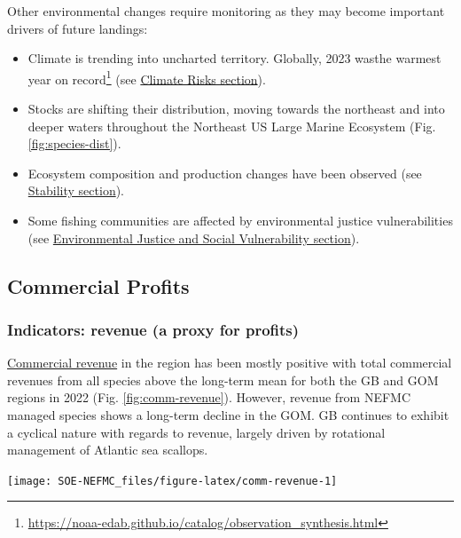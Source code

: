 \documentclass[
  10pt,
]{article}
\providecommand{\tightlist}{%
  \setlength{\itemsep}{0pt}\setlength{\parskip}{0pt}}
\let\origfigure\figure
\let\endorigfigure\endfigure
\renewenvironment{figure}[1][2] {
    \expandafter\origfigure\expandafter[H]
} {
    \endorigfigure
}
\begin{document}
Other environmental changes require monitoring as they may become important drivers of future landings:

\begin{itemize}
\tightlist
\item
  Climate is trending into uncharted territory. Globally, 2023 wasthe warmest year on record\footnote{\url{https://noaa-edab.github.io/catalog/observation_synthesis.html}} (see \protect\hyperlink{climate-risks}{Climate Risks section}).
\item
  Stocks are shifting their distribution, moving towards the northeast and into deeper waters throughout the Northeast US Large Marine Ecosystem (Fig. \ref{fig:species-dist}).
\item
  Ecosystem composition and production changes have been observed (see \protect\hyperlink{stability}{Stability section}).
\item
  Some fishing communities are affected by environmental justice vulnerabilities (see \protect\hyperlink{social-vulnerability}{Environmental Justice and Social Vulnerability section}).
\end{itemize}

\newpage

\hypertarget{commercial-profits}{%
\subsection{Commercial Profits}\label{commercial-profits}}

\hypertarget{indicators-revenue-a-proxy-for-profits}{%
\subsubsection{Indicators: revenue (a proxy for profits)}\label{indicators-revenue-a-proxy-for-profits}}

\href{https://noaa-edab.github.io/catalog/comdat.html}{Commercial revenue} in the region has been mostly positive with total commercial revenues from all species above the long-term mean for both the GB and GOM regions in 2022 (Fig. \ref{fig:comm-revenue}). However, revenue from NEFMC managed species shows a long-term decline in the GOM. GB continues to exhibit a cyclical nature with regards to revenue, largely driven by rotational management of Atlantic sea scallops.

\begin{figure}

{\centering \texttt{[image: SOE-NEFMC\_files/figure-latex/comm-revenue-1]} 

}

\caption{Revenue through 2022 for the New England region: total (black) and from NEFMC managed species (red).}\label{fig:comm-revenue}
\end{figure}
\end{document}
